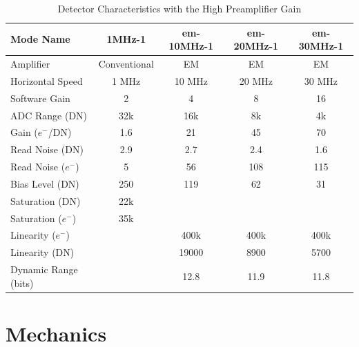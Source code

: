 \begin{table}
    \centering
    \begin{tabular}{lcccc}
    \hline
    Mode Name&1MHz-1&em-10MHz-1&em-20MHz-1&em-30MHz-1\\
    \hline
    Amplifier&Conventional&EM&EM&EM\\
    Horizontal Speed&1 MHz&10 MHz&20 MHz&30 MHz\\
    Software Gain&2&4&8&16\\
    ADC Range (DN)&32k&16k&8k&4k\\
    Gain ($e^-$/DN)&1.6&21&45&70\phantom{0}\\
    Read Noise (DN)&2.9&2.7&2.4&1.6\\
    Read Noise ($e^-$)&5&56&108&115\\
    Bias Level (DN)&250&119&62&31\\
    Saturation (DN)&22k&\\
    Saturation ($e^-$)&35k&\\
    Linearity ($e^-$)&&400k&400k&400k\\
    Linearity (DN)&&19000&8900&5700\\
    Dynamic Range (bits)&&12.8&11.9&11.8\\
    \hline
    \end{tabular}
    \caption{Detector Characteristics with the High Preamplifier Gain}
    \label{table:huitzi-f20-detector-characteristics-high-gain}
\end{table}

\section{Mechanics}

